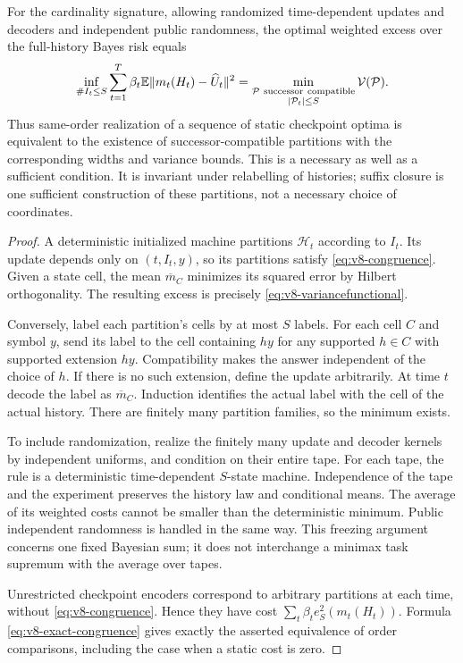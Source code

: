 \begin{theorem}
\label{thm:v8-congruence}
For the cardinality signature, allowing randomized time-dependent
updates and decoders and independent public randomness, the optimal
weighted excess over the full-history Bayes risk equals
\begin{equation}
 \inf_{\#I_t\le S}
 \sum_{t=1}^T\beta_t\mathbb E\|m_t(H_t)-\widehat U_t\|^2
 =\min_{\substack{\mathcal P\ \mathrm{successor\ compatible}\\
                         |\mathcal P_t|\le S}}
                         \mathcal V(\mathcal P).       \label{eq:v8-exact-congruence}
\end{equation}
Thus same-order realization of a sequence of static checkpoint optima
is equivalent to the existence of successor-compatible partitions
with the corresponding widths and variance bounds. This is a necessary
as well as a sufficient condition. It is invariant under relabelling of
histories; suffix closure is one sufficient construction of these
partitions, not a necessary choice of coordinates.
\end{theorem}
\begin{proof}
A deterministic initialized machine partitions $\mathcal H_t$ according
to $I_t$. Its update depends only on $(t,I_t,y)$, so its partitions satisfy
\eqref{eq:v8-congruence}. Given a state cell, the mean $\overline m_C$
minimizes its squared error by Hilbert orthogonality. The resulting
excess is precisely \eqref{eq:v8-variancefunctional}.

Conversely, label each partition's cells by at most $S$ labels. For each
cell $C$ and symbol $y$, send its label to the cell containing $hy$ for
any supported $h\in C$ with supported extension $hy$. Compatibility
makes the answer independent of the choice of $h$. If there is no such
extension, define the update arbitrarily. At time $t$ decode the label
as $\overline m_C$. Induction identifies the actual label with the cell
of the actual history. There are finitely many partition families, so
the minimum exists.

To include randomization, realize the finitely many update and decoder
kernels by independent uniforms, and condition on their entire tape.
For each tape, the rule is a deterministic time-dependent $S$-state
machine. Independence of the tape and the experiment preserves the
history law and conditional means. The average of its weighted costs
cannot be smaller than the deterministic minimum. Public independent
randomness is handled in the same way. This freezing argument concerns
one fixed Bayesian sum; it does not interchange a minimax task supremum
with the average over tapes.

Unrestricted checkpoint encoders correspond to arbitrary partitions at
each time, without \eqref{eq:v8-congruence}. Hence they have cost
$\sum_t\beta_t e_S^2(m_t(H_t))$. Formula
\eqref{eq:v8-exact-congruence} gives exactly the asserted equivalence of
order comparisons, including the case when a static cost is zero.
\end{proof}

